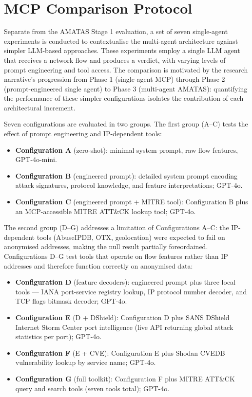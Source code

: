 \documentclass[../main.tex]{subfiles}
\begin{document}
\section{MCP Comparison Protocol}
\label{sec:mcp-comparison-protocol}

Separate from the AMATAS Stage 1 evaluation, a set of seven single-agent experiments is conducted to contextualise the multi-agent architecture against simpler LLM-based approaches. These experiments employ a single LLM agent that receives a network flow and produces a verdict, with varying levels of prompt engineering and tool access. The comparison is motivated by the research narrative's progression from Phase 1 (single-agent MCP) through Phase 2 (prompt-engineered single agent) to Phase 3 (multi-agent AMATAS): quantifying the performance of these simpler configurations isolates the contribution of each architectural increment.

Seven configurations are evaluated in two groups. The first group (A--C) tests the effect of prompt engineering and IP-dependent tools:

\begin{itemize}[leftmargin=1.5em, itemsep=2pt]
  \item \textbf{Configuration A} (zero-shot): minimal system prompt, raw flow features, GPT-4o-mini.
  \item \textbf{Configuration B} (engineered prompt): detailed system prompt encoding attack signatures, protocol knowledge, and feature interpretations; GPT-4o.
  \item \textbf{Configuration C} (engineered prompt + MITRE tool): Configuration B plus an MCP-accessible MITRE ATT\&CK lookup tool; GPT-4o.
\end{itemize}

The second group (D--G) addresses a limitation of Configurations A--C: the IP-dependent tools (AbuseIPDB, OTX, geolocation) were expected to fail on anonymised addresses, making the null result partially foreordained. Configurations D--G test tools that operate on flow features rather than IP addresses and therefore function correctly on anonymised data:

\begin{itemize}[leftmargin=1.5em, itemsep=2pt]
  \item \textbf{Configuration D} (feature decoders): engineered prompt plus three local tools --- IANA port-service registry lookup, IP protocol number decoder, and TCP flags bitmask decoder; GPT-4o.
  \item \textbf{Configuration E} (D + DShield): Configuration D plus SANS DShield Internet Storm Center port intelligence (live API returning global attack statistics per port); GPT-4o.
  \item \textbf{Configuration F} (E + CVE): Configuration E plus Shodan CVEDB vulnerability lookup by service name; GPT-4o.
  \item \textbf{Configuration G} (full toolkit): Configuration F plus MITRE ATT\&CK query and search tools (seven tools total); GPT-4o.
\end{itemize}
\end{document}

